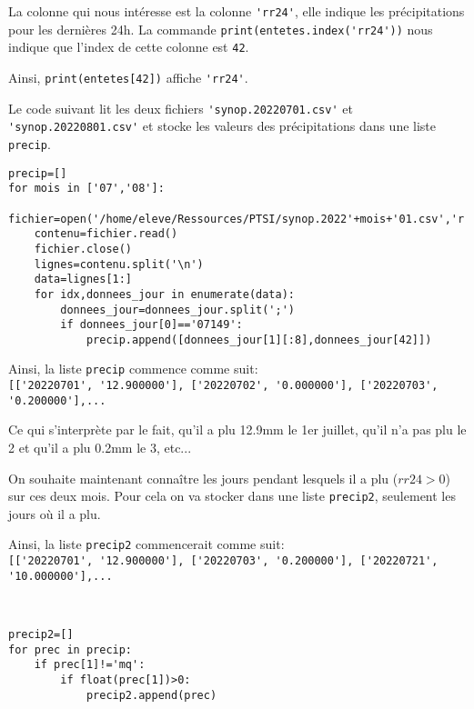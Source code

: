 La colonne qui nous intéresse est la colonne \verb?'rr24'?, elle indique les précipitations pour les dernières 24h. La commande \verb?print(entetes.index('rr24'))? nous indique que l'index de cette colonne est \verb?42?.

Ainsi, \verb?print(entetes[42])? affiche \verb?'rr24'?.

Le code suivant lit les deux fichiers \verb?'synop.20220701.csv'? et \verb?'synop.20220801.csv'? et stocke les valeurs des précipitations dans une liste \verb?precip?.

\begin{verbatim}
precip=[]
for mois in ['07','08']:    
    fichier=open('/home/eleve/Ressources/PTSI/synop.2022'+mois+'01.csv','r')
    contenu=fichier.read()
    fichier.close()
    lignes=contenu.split('\n')
    data=lignes[1:]
    for idx,donnees_jour in enumerate(data):
        donnees_jour=donnees_jour.split(';')
        if donnees_jour[0]=='07149':
            precip.append([donnees_jour[1][:8],donnees_jour[42]])
\end{verbatim}

Ainsi, la liste \verb?precip? commence comme suit:\\
\verb?[['20220701', '12.900000'], ['20220702', '0.000000'], ['20220703', '0.200000'],...?

Ce qui s'interprète par le fait, qu'il a plu 12.9mm le 1er juillet, qu'il n'a pas plu le 2 et qu'il a plu 0.2mm le 3, etc...

On souhaite maintenant connaître les jours pendant lesquels il a plu ($rr24>0$) sur ces deux mois. Pour cela on va stocker dans une liste \verb?precip2?, seulement les jours où il a plu.

Ainsi, la liste \verb?precip2? commencerait comme suit:\\
\verb?[['20220701', '12.900000'], ['20220703', '0.200000'], ['20220721', '10.000000'],...?


\begin{solution}~\ \\
\begin{verbatim}
precip2=[]
for prec in precip:
    if prec[1]!='mq':
        if float(prec[1])>0:
            precip2.append(prec)
\end{verbatim}
\end{solution}


